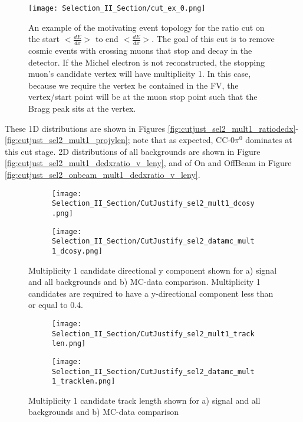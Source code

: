 \begin{figure}[h!]
\centering
\texttt{[image: Selection\_II\_Section/cut\_ex\_0.png]}
\caption{An example of the motivating event topology for the ratio cut on the start $<\frac{dE}{dx}>$ to end $<\frac{dE}{dx}>$.  The goal of this cut is to remove cosmic events with crossing muons that stop and decay in the detector. If the Michel electron is not reconstructed, the stopping muon’s candidate vertex will have multiplicity 1.  In this case, because we require the vertex be contained in the FV, the vertex/start point will be at the muon stop point such that the Bragg peak sits at the vertex. }
\label{fig:cut_ex_0}
\end{figure}

These 1D distributions are shown in Figures \ref{fig:cutjust_sel2_mult1_ratiodedx}-\ref{fig:cutjust_sel2_mult1_projylen}; note that as expected, CC-0$\pi^0$ dominates at this cut stage. 2D distributions of all backgrounds are shown in Figure \ref{fig:cutjust_sel2_mult1_dedxratio_v_leny}, and of On and OffBeam in Figure \ref{fig:cutjust_sel2_onbeam_mult1_dedxratio_v_leny}.

\begin{figure}[h!]
\centering
  \begin{subfigure}[t]{0.4\textwidth}
    \centering
\texttt{[image: Selection\_II\_Section/CutJustify\_sel2\_mult1\_dcosy.png]}
    \caption{ }
  \end{subfigure} 
  \hspace{20mm}
  \begin{subfigure}[t]{0.4\textwidth}
    \centering
\texttt{[image: Selection\_II\_Section/CutJustify\_sel2\_datamc\_mult1\_dcosy.png]}
    \caption{ }
  \end{subfigure} 
\caption{Multiplicity 1 candidate directional y component shown for a) signal and all backgrounds and b) MC-data comparison.  Multiplicity 1 candidates are required to have a y-directional component less than or equal to 0.4. }
\label{fig:cutjust_sel2_mult1_cosy}
\end{figure}

\begin{figure}[h!]
\centering
  \begin{subfigure}[t]{0.4\textwidth}
    \centering
\texttt{[image: Selection\_II\_Section/CutJustify\_sel2\_mult1\_tracklen.png]}
    \caption{ }
  \end{subfigure} 
  \hspace{20mm}
  \begin{subfigure}[t]{0.4\textwidth}
    \centering
\texttt{[image: Selection\_II\_Section/CutJustify\_sel2\_datamc\_mult1\_tracklen.png]}
    \caption{ }
  \end{subfigure} 
\caption{Multiplicity 1 candidate track length shown for a) signal and all backgrounds and b) MC-data comparison }
\label{fig:cutjust_sel2_mult1_len}
\end{figure}


